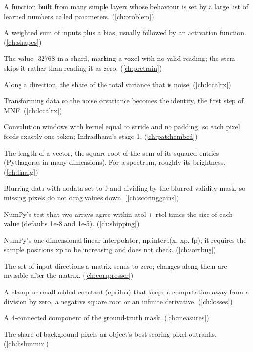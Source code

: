 \begin{description}[style=nextline,leftmargin=1.2em,font=\normalfont\bfseries]
\item[Neural network] A function built from many simple layers whose behaviour is set by a large list of learned numbers called parameters. (\cref{ch:problem})
\item[Neuron] A weighted sum of inputs plus a bias, usually followed by an activation function. (\cref{ch:shapes})
\item[Nodata] The value -32768 in a shard, marking a voxel with no valid reading; the stem skips it rather than reading it as zero. (\cref{ch:pretrain})
\item[Noise fraction] Along a direction, the share of the total variance that is noise. (\cref{ch:localrx})
\item[Noise whitening] Transforming data so the noise covariance becomes the identity, the first step of MNF. (\cref{ch:localrx})
\item[Non-overlapping windows] Convolution windows with kernel equal to stride and no padding, so each pixel feeds exactly one token; Indradhanu's stage 1. (\cref{ch:patchembed})
\item[Norm] The length of a vector, the square root of the sum of its squared entries (Pythagoras in many dimensions). For a spectrum, roughly its brightness. (\cref{ch:linalg})
\item[Normalised convolution] Blurring data with nodata set to 0 and dividing by the blurred validity mask, so missing pixels do not drag values down. (\cref{ch:scoringgains})
\item[np.allclose] NumPy's test that two arrays agree within atol + rtol times the size of each value (defaults 1e-8 and 1e-5). (\cref{ch:shipping})
\item[np.interp] NumPy's one-dimensional linear interpolator, np.interp(x, xp, fp); it requires the sample positions xp to be increasing and does not check. (\cref{ch:sortbug})
\item[Null space] The set of input directions a matrix sends to zero; changes along them are invisible after the matrix. (\cref{ch:compressor})
\item[Numerical guard] A clamp or small added constant (epsilon) that keeps a computation away from a division by zero, a negative square root or an infinite derivative. (\cref{ch:losses})
\item[Object] A 4-connected component of the ground-truth mask. (\cref{ch:measures})
\item[Object AUC] The share of background pixels an object's best-scoring pixel outranks. (\cref{ch:hslunmix})

\end{description}
